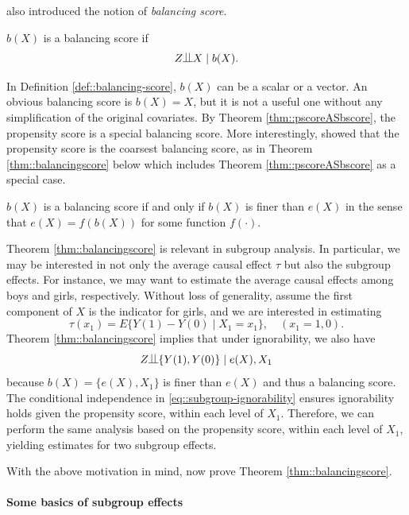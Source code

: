 \citet{rosenbaum1983central} also introduced the notion of {\it balancing score}.

\begin{definition}
\label{def::balancing-score}
  $b(X)$ is a balancing score if 
  $$
  Z\ind X\mid b(X).
  $$
\end{definition}

In Definition \ref{def::balancing-score},  $b(X)$ can be a scalar or a vector. An obvious balancing score is $b(X) = X$, but it is not a useful one without any simplification of the original covariates. By Theorem \ref{thm::pscoreASbscore}, the propensity score is a special balancing score. More interestingly, \citet{rosenbaum1983central} showed that the propensity score is the coarsest balancing score, as in Theorem \ref{thm::balancingscore} below which includes Theorem \ref{thm::pscoreASbscore} as a special case. 


\begin{theorem}
\label{thm::balancingscore}
$b(X)$ is a balancing score if and only if $b(X)$ is finer than $e(X)$ in the sense that $e(X) = f(b(X))$ for some function $f(\cdot)$. 
\end{theorem}


Theorem \ref{thm::balancingscore} is relevant in subgroup analysis. In particular, we may be interested in not only the average causal effect $\tau$ but also the subgroup effects. For instance, we may want to estimate the average causal effects among boys and girls, respectively. Without loss of generality, assume the first component of $X$ is the indicator for girls, and we are interested in estimating 
$$
\tau(x_1) = E\{ Y(1) - Y(0) \mid X_1 = x_1  \},\quad (x_1=1,0).
$$
Theorem \ref{thm::balancingscore} implies that under ignorability, we also have 
\begin{equation}
\label{eq::subgroup-ignorability}
Z\ind \{ Y(1) , Y(0) \} \mid e(X), X_1
\end{equation}
because $b(X) = \{e(X), X_1\}$ is finer than $e(X)$ and thus a balancing score. The conditional independence in \eqref{eq::subgroup-ignorability} ensures ignorability holds given the propensity score, within each level of $X_1$. Therefore, we can perform the same analysis based on the propensity score, within each level of $X_1$, yielding estimates for two subgroup effects. 


With the above motivation in mind, now prove Theorem \ref{thm::balancingscore}. 


\paragraph{Some basics of subgroup effects}

